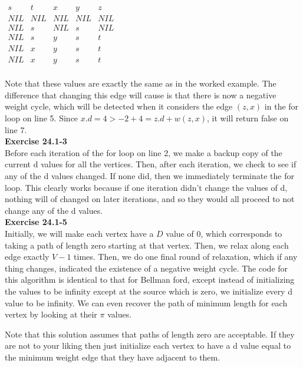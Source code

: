 \documentclass{article}
\begin{document}
\begin{center}
$
\begin{array}{|c|c|c|c|c|}
s&t&x&y&z\\
\hline
NIL&NIL&NIL&NIL&NIL\\
NIL&s&NIL&s&NIL\\
NIL&s&y&s&t\\
NIL&x&y&s&t\\
NIL&x&y&s&t\\
\end{array}
$
\end{center}

Note that these values are exactly the same as in the worked example. The difference that changing this edge will cause is that there is now a negative weight cycle, which will be detected when it considers the edge $(z,x)$ in the for loop on line 5. Since $x.d = 4 > -2 + 4 = z.d + w(z,x)$, it will return false on line 7.\\

\noindent\textbf{Exercise 24.1-3}\\
Before each iteration of the for loop on line 2, we make a backup copy of the current d values for all the vertices. Then, after each iteration, we check to see if any of the d values changed. If none did, then we immediately terminate the for loop. This clearly works because if one iteration didn't change the values of d, nothing will of changed on later iterations, and so they would all proceed to not change any of the d values.\\

\noindent\textbf{Exercise 24.1-5}\\
Initially, we will make each vertex have a $D$ value of 0, which corresponds to taking a path of length zero starting at that vertex. Then, we relax along each edge exactly $V-1$ times. Then, we do one final round of relaxation,  which if any thing changes, indicated the existence of a negative weight cycle. The code for this algorithm is identical to that for Bellman ford, except instead of initializing the values to be infinity except at the source which is zero, we initialize every d value to be infinity. We can even recover the path of minimum length for each vertex by looking at their $\pi$ values.

Note that this solution assumes that paths of length zero are acceptable. If they are not to your liking then just initialize each vertex to have a d value equal to the minimum weight edge that they have adjacent to them.\\
\end{document}
